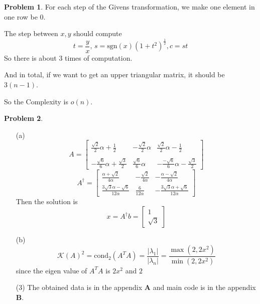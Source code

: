 \documentclass[a4paper]{article}
\theoremstyle{definition}
\newtheorem{problem}{Problem}
\theoremstyle{plain}
\newcommand{\cond}[1]{\mathrm{cond}_{#1}}
\newcommand{\sgn}{\mathrm{sgn}}
\newcommand{\dps}{\displaystyle}
\numberwithin{equation}{problem}
\begin{document}
\begin{problem}
    For each step of the Givens transformation, we make one element in one row be $ 0 $.
    
    The step between  $ x,y $  should compute 
    \[t=\frac{y}{x},\,s=\sgn(x)(1+t^2)^{\frac{1}{2}},c=st\]
    So there is about  $ 3 $ times of computation.

    And in total, if we want to get an upper triangular matrix, it should be  $ 3(n-1) $.
    
    So the Complexity is  $ o(n) $. 
\end{problem}

\begin{problem}
    \begin{enumerate}
        \item[(a)] \begin{equation}
            A=\begin{bmatrix}
                \dps\frac{\sqrt{2}}{2}\alpha+\frac{1}{2}&-\dps\frac{\sqrt{2}}{2}\alpha&\dps\frac{\sqrt{2}}{2}\alpha-\dps\frac{1}{2}\\
                \\
                -\dps\frac{\sqrt{6}}{6}\alpha+\dps\frac{\sqrt{3}}{2}&\dps\frac{\sqrt{6}}{6}\alpha&\dps-\frac{-\sqrt{6}}{6}\alpha-\frac{\sqrt{3}}{2}
            \end{bmatrix}
        \end{equation}
        \begin{equation}
            A^\dagger=\begin{bmatrix}
                 \dps\frac{\alpha + \sqrt{2}}{4\alpha}& \dps-\frac{\sqrt{2}}{4\alpha}&    \dps       -\frac{\alpha-\sqrt{2}}{4\alpha} \\
                 \dps\frac{3\sqrt{3}\alpha - \sqrt{6}}{12\alpha}&\dps \frac{6}{12\alpha}& \dps-\frac{3\sqrt{3}\alpha + \sqrt{6}}{12\alpha}        
            \end{bmatrix}
        \end{equation}
        Then the solution is 
        \[x=A^\dagger b=\begin{bmatrix}
            
         1\\
         \sqrt{3}        
        \end{bmatrix}\]
        \item[(b)]
         \[\mathcal{K}(A)^2=\cond{2}(A^TA)=\dps\frac{|\lambda_1|}{|\lambda_n|}=\dps\frac{\max(2,2x^2)}{\min(2,2x^2)}\]
         since the eigen value of  $ A^TA $ is  $ 2x^2 $ and  $ 2 $ 
         \item[(3)]
         The obtained data is in the appendix \textbf{A} and main code is in the appendix \textbf{B}.


\end{enumerate}
\end{problem}
\end{document}
